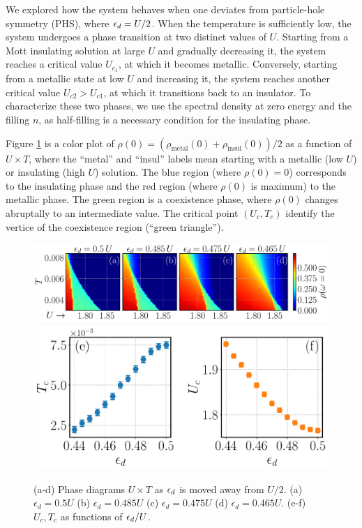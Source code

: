 \documentclass[12pt]{report}
\newcommand{\ALERT}[1]{\textcolor{red}{#1}}
\begin{document}
We explored how the system behaves when one deviates from particle-hole symmetry (PHS), where $\epsilon_d = U/2$. When the temperature is sufficiently low, the system undergoes a phase transition at two distinct values of $U$. Starting from a Mott insulating solution at large $U$ and gradually decreasing it, the system reaches a critical value $U_{c_1}$, at which it becomes metallic. Conversely, starting from a metallic state at low $U$ and increasing it, the system reaches another critical value $U_{c2} > U_{c1}$, at which it transitions back to an insulator. To characterize these two phases, we use the spectral density at zero energy \cite{georges1996} and the filling $n$, as half-filling is a necessary condition for the insulating phase.

Figure \ref{fig:UxT-rho0} is a color plot of $\rho(0) = (\rho_{\text{metal}}(0) + \rho_{\text{insul}}(0))/2$ as a function of $U \times T$, where the ``metal'' and ``insul'' labels mean starting with a metallic (low $U$) or insulating (high $U$) solution. The blue region (where $\rho(0) = 0$) corresponds to the insulating phase and the red region (where $\rho(0)$ is maximum) to the metallic phase. The green region is a coexistence phase, where $\rho(0)$ changes abruptally to an intermediate value. The critical point $(U_c, T_c)$ identify the vertice of the coexistence region (``green triangle'').


\begin{figure}[H]
\centering
\includegraphics[width=0.8\columnwidth]{fig/fig2-abcd-eps-converted-to.pdf}
\includegraphics[width=0.48\columnwidth]{fig/fig2-ef-eps-converted-to.pdf}
\caption{(a-d) Phase diagrams $U \times T$ as $\epsilon_d$ is moved away from $U/2$. (a) $\epsilon_d=0.5U$ (b) $\epsilon_d=0.485U$ (c) $\epsilon_d=0.475U$ (d) $\epsilon_d=0.465U$. (e-f) $U_c, T_c$ as functions of $\epsilon_d/U$. }
\label{fig:UxT-rho0}
\end{figure}
\end{document}
